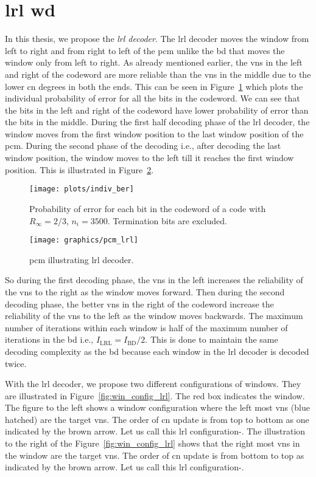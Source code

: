 \section{\acrfull{lrl} \acrfull{wd}}
In this thesis, we propose the \emph{\gls{lrl} decoder}. The \gls{lrl} decoder moves the window from left to right and from right to left of the \gls{pcm} unlike the \gls{bd} that moves the window only from left to right. As already mentioned earlier, the \glspl{vn} in the left and right of the codeword are more reliable than the \glspl{vn} in the middle due to the lower \gls{cn} degrees in both the ends. This can be seen in Figure~\ref{fig:indiv_ber} which plots the individual probability of error for all the bits in the codeword. We can see that the bits in the left and right of the codeword have lower probability of error than the bits in the middle. During the first half decoding phase of the \gls{lrl} decoder, the window moves from the first window position to the last window position of the \gls{pcm}. During the second phase of the decoding i.e., after decoding the last window position, the window moves to the left till it reaches the first window position. This is illustrated in Figure~\ref{fig:pcm_lrl}.
\begin{figure}[htbp]
  \centering
  \texttt{[image: plots/indiv\_ber]}
  \caption{Probability of error for each bit in the codeword of a code with $R_\infty=2/3$, $n_i=3500$. Termination bits are excluded.}
  \label{fig:indiv_ber}
\end{figure}

\begin{figure}[htbp]
  \centering
  \texttt{[image: graphics/pcm\_lrl]}
  \caption{\gls{pcm} illustrating \gls{lrl} decoder.}
  \label{fig:pcm_lrl}
\end{figure}
So during the first decoding phase, the \glspl{vn} in the left increases the reliability of the \glspl{vn} to the right as the window moves forward. Then during the second decoding phase, the better \glspl{vn} in the right of the codeword increase the reliability of the \glspl{vn} to the left as the window moves backwards. The maximum number of iterations within each window is half of the maximum number of iterations in the \gls{bd} i.e., $I_{\text{LRL}}=I_{\text{BD}}/2$. This is done to maintain the same decoding complexity as the \gls{bd} because each window in the \gls{lrl} decoder is decoded twice.

With the \gls{lrl} decoder, we propose two different configurations of windows. They are illustrated in Figure~\ref{fig:win_config_lrl}. The red box indicates the window. The figure to the left shows a window configuration where the left most \glspl{vn} (blue hatched) are the target \glspl{vn}. The order of \gls{cn} update is from top to bottom as one indicated by the brown arrow. Let us call this \gls{lrl} configuration-. The illustration to the right of the Figure~\ref{fig:win_config_lrl} shows that the right most \glspl{vn} in the window are the target \glspl{vn}. The order of \gls{cn} update is from bottom to top as indicated by the brown arrow. Let us call this \gls{lrl} configuration-.

